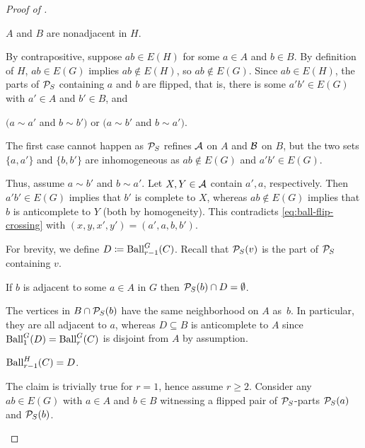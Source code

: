\begin{proof}[Proof of ]
    \begin{claim}[\ref{itm:ball-flip-P1}]\label{clm:ball-flip-P1}
        $A$ and $B$ are nonadjacent in $H$.
    \end{claim}
    \begin{claimproof}
By contrapositive, suppose $ab\in E(H)$ for some $a \in A$ and $b \in B$.
    By definition of $H$,  $ab\in E(G)$ implies $ab\notin E(H)$, so
     $ab\notin E(G)$.
    Since $ab\in E(H)$, the parts of $\PP_S$ containing $a$ and $b$ are flipped, that is, there is some $a'b'\in E(G)$ with $a' \in A$ and $b' \in B$,
    and 
    \begin{center}
        $(a\sim a'$ and $b\sim b')$
        \qquad
        or
        \qquad
        $(a\sim b'$ and $b\sim a')$.
    \end{center}
    The first case cannot happen 
    as $\PP_S$ refines $\AA$ on $A$ and $\BB$ on $B$, but the two sets $\{a,a'\}$ and $\{b,b'\}$ are inhomogeneous as $ab\notin E(G)$ and $a'b'\in E(G)$.

    Thus, assume $a\sim b'$ and $b\sim a'$.
    Let $X,Y\in\AA$ contain $a',a$, respectively.
    Then $a'b'\in E(G)$ implies that $b'$ is complete to $X$, whereas  $ab\notin E(G)$ implies that $b$ is anticomplete to $Y$ (both by homogeneity). This contradicts \eqref{eq:ball-flip-crossing} with $(x,y,x',y')=(a',a,b,b')$.
\end{claimproof}

    For brevity, we define $D\coloneqq \Ball_{r-1}^G(C)$. Recall that $\PP_S(v)$ is the part of $\PP_S$ containing $v$.

    \begin{claim}\label{clm:disjoint-from-d}
        If $b$ is adjacent to some $a\in A$ in $G$ then $\PP_S(b)\cap D=\emptyset$.
    \end{claim}
    \begin{claimproof}
            The vertices in $B \cap \PP_S(b)$ have the same neighborhood on $A$ as~$b$. In particular, they are all adjacent to $a$, whereas $D \subseteq B$ is anticomplete to $A$ since $\Ball^G_1(D)=\Ball^G_r(C)$ is disjoint from $A$ by assumption.
    \end{claimproof}

    \begin{claim}[\ref{itm:ball-flip-P2}]\label{clm:ball-flip-P2}
        $\Ball_{r-1}^H(C)=D$.
    \end{claim}
    \begin{claimproof}
    The claim is trivially true for $r = 1$, hence assume $r\geq 2$.
    Consider any  $ab\in E(G)$ with $a \in A$ and $b \in B$ witnessing a flipped pair of $\PP_S$-parts $\PP_S(a)$ and $\PP_S(b)$.


\end{claimproof}
\end{proof}
